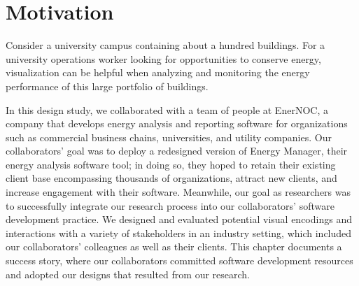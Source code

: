 
\section{Motivation}
\label{emu:introduction}


Consider a university campus containing about a hundred buildings. 
For a university operations worker looking for opportunities to conserve energy, visualization can be helpful when analyzing and monitoring the energy performance of this large portfolio of buildings. 

In this design study, we collaborated with a team of people at EnerNOC, a company that develops energy analysis and reporting software for organizations such as commercial business chains, universities, and utility companies.
Our collaborators' goal was to deploy a redesigned version of Energy Manager, their energy analysis software tool; in doing so, they hoped to retain their existing client base encompassing thousands of organizations, attract new clients, and increase engagement with their software. 
Meanwhile, our goal as researchers was to successfully integrate our research process into our collaborators' software development practice.
We designed and evaluated potential visual encodings and interactions with a variety of stakeholders in an industry setting, which included our collaborators' colleagues as well as their clients.
This chapter documents a success story, where our collaborators committed software development resources and adopted our designs that resulted from our research.

